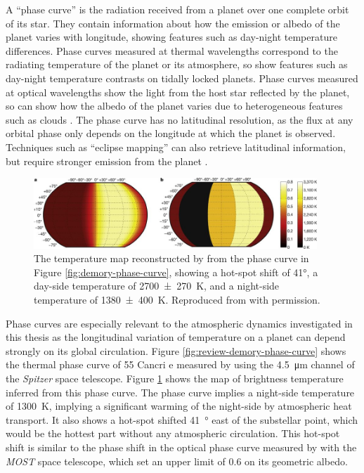 A ``phase curve'' is the radiation received from a planet over one complete orbit of its star. They contain information about how the emission or albedo of the planet varies with longitude, showing features such as day-night temperature differences. Phase curves measured at thermal wavelengths correspond to the radiating temperature of the planet or its atmosphere, so show features such as day-night temperature contrasts on tidally locked planets. Phase curves measured at optical wavelengths show the light from the host star reflected by the planet, so can show how the albedo of the planet varies due to heterogeneous features such as clouds \citep{parmentier2016transitions,parmentier2017handbook}. The phase curve has no latitudinal resolution, as the flux at any orbital phase only depends on the longitude at which the planet is observed. Techniques such as ``eclipse mapping'' can also retrieve latitudinal information, but require stronger emission from the planet \citep{majeau20122dmap}.

\begin{figure}
  \centering
  \includegraphics[width=0.95\textwidth]{figures/linking-climate-55cnce/demory-temp-maps.jpg}
\caption{The temperature map reconstructed by \citet{demory201655cnce} from the phase curve in Figure \ref{fig:demory-phase-curve}, showing a hot-spot shift of \ang{41}, a day-side temperature of \SI[separate-uncertainty = true]{2700(270)}{\kelvin}, and a night-side temperature of \SI[separate-uncertainty = true]{1380(400)}{\kelvin}. Reproduced from \citet{demory201655cnce} with permission.}\label{fig:review-demory-temp-maps}
\end{figure}

Phase curves are especially relevant to the atmospheric dynamics investigated in this thesis as the longitudinal variation of temperature on a planet can depend strongly on its global circulation. Figure \ref{fig:review-demory-phase-curve} shows the thermal phase curve of 55 Cancri e measured by \citet{demory201655cnce} using the \SI{4.5}{\micro\metre} channel of the \textit{Spitzer} space telescope. Figure \ref{fig:review-demory-temp-maps} shows the map of brightness temperature inferred from this phase curve. The phase curve implies a night-side temperature of \SI{1300}{\kelvin}, implying a significant warming of the night-side by atmospheric heat transport. It also shows a hot-spot shifted \SI{41}{\degree} east of the substellar point, which would be the hottest part without any atmospheric circulation. This hot-spot shift is similar to the phase shift in the optical phase curve measured by \citet{dragomir2012most} with the \textit{MOST} space telescope, which set an upper limit of 0.6 on its geometric albedo.

